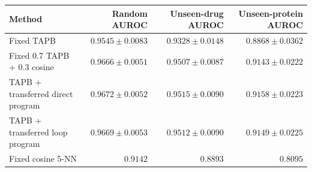 \centering\footnotesize\setlength{\tabcolsep}{3pt}
\begin{tabularx}{\linewidth}{Xrrr}
\toprule
Method & Random AUROC & Unseen-drug AUROC & Unseen-protein AUROC \\
\midrule
Fixed TAPB & \(0.9545 \pm 0.0083\) & \(0.9328 \pm 0.0148\) & \(0.8868 \pm 0.0362\) \\
Fixed 0.7 TAPB + 0.3 cosine & \(0.9666 \pm 0.0051\) & \(0.9507 \pm 0.0087\) & \(0.9143 \pm 0.0222\) \\
TAPB + transferred direct program & \(0.9672 \pm 0.0052\) & \(0.9515 \pm 0.0090\) & \(0.9158 \pm 0.0223\) \\
TAPB + transferred loop program & \(0.9669 \pm 0.0053\) & \(0.9512 \pm 0.0090\) & \(0.9149 \pm 0.0225\) \\
Fixed cosine 5-NN & \(0.9142\) & \(0.8893\) & \(0.8095\) \\
\bottomrule
\end{tabularx}
\caption{Frozen DTI probability programs transferred to TAPB without new research or training. Mean and sample SD use five fixed research/fit pairings (542--546 to 342--346), not ten independent TAPB fits. The original manual mixture and deterministic cosine reference remain explicit. All three public test splits and all 63 declared labels are retained.}
\label{tab:dti-tapb-program-transfer}
